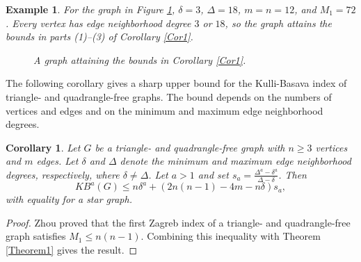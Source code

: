 \documentclass[10pt,a4paper]{amsart}
\newtheorem{cor}[theorem]{Corollary}
\newtheorem{example}[theorem]{Example}
\numberwithin{equation}{section}
\begin{document}
\begin{example}
For the graph in Figure \ref{fig:1}, $\delta=3$, $\Delta=18$, $m=n=12$, and $M_1=72$. Every vertex has edge neighborhood degree $3$ or $18$, so the graph attains the bounds in parts (1)--(3) of Corollary \ref{Cor1}.
\begin{figure}[h]
\centering
\begin{minipage}{.4\textwidth}
  \centering
\caption{A graph attaining the bounds in Corollary \ref{Cor1}.}
  \label{fig:1}
\end{minipage}%

\end{figure}
\end{example}

The following corollary gives a sharp upper bound for the Kulli-Basava index of triangle- and quadrangle-free graphs. The bound depends on the numbers of vertices and edges and on the minimum and maximum edge neighborhood degrees.

\begin{cor}
Let $G$ be a triangle- and quadrangle-free graph with $n\geq 3$ vertices and $m$ edges. Let $\delta$ and $\Delta$ denote the minimum and maximum edge neighborhood degrees, respectively, where $\delta\neq\Delta$. Let $a>1$ and set $s_a=\frac{\Delta^a-\delta^a}{\Delta-\delta}$. Then
\[
KB^a(G)\leq n\delta^a+(2n(n-1)-4m-n\delta)s_a,
\]
with equality for a star graph.
\end{cor}

\begin{proof}
Zhou \cite{zhou2006note} proved that the first Zagreb index of a triangle- and quadrangle-free graph satisfies $M_1\leq n(n-1)$. Combining this inequality with Theorem \ref{Theorem1} gives the result.
\end{proof}
\end{document}
